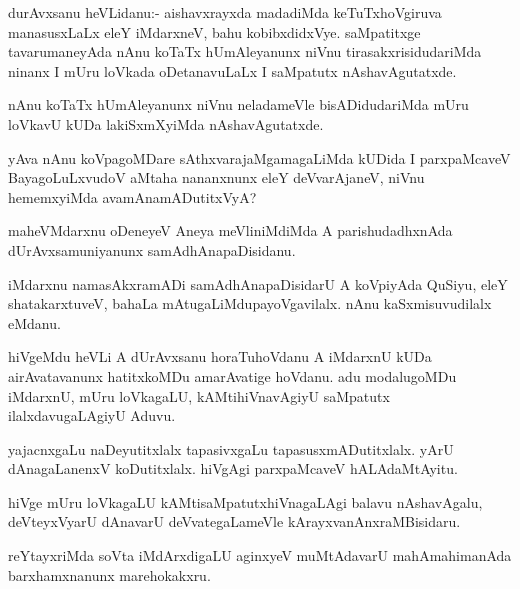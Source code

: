 \documentclass{article}
\begin{document}
\begin{mn}
durAvxsanu heVLidanu:- aishavxrayxda madadiMda keTuTxhoVgiruva
manasusxLaLx eleY iMdarxneV, bahu kobibxdidxVye. saMpatitxge
tavarumaneyAda nAnu koTaTx hUmAleyanunx niVnu tirasakxrisidudariMda
ninanx I mUru loVkada oDetanavuLaLx I saMpatutx nAshavAgutatxde.
\end{mn}

\begin{mn}
nAnu koTaTx hUmAleyanunx niVnu neladameVle bisADidudariMda mUru
loVkavU kUDa lakiSxmXyiMda nAshavAgutatxde.
\end{mn}

\begin{mn}
yAva nAnu koVpagoMDare sAthxvarajaMgamagaLiMda kUDida I parxpaMcaveV
BayagoLuLxvudoV aMtaha nananxnunx eleY deVvarAjaneV, niVnu hememxyiMda avamAnamADutitxVyA?
\end{mn}

\begin{mn}
maheVMdarxnu oDeneyeV Aneya meVliniMdiMda A parishudadhxnAda
dUrAvxsamuniyanunx samAdhAnapaDisidanu.
\end{mn}

\begin{mn}%
iMdarxnu namasAkxramADi samAdhAnapaDisidarU A koVpiyAda QuSiyu, eleY
shatakarxtuveV, bahaLa mAtugaLiMdupayoVgavilalx. nAnu kaSxmisuvudilalx eMdanu.
\end{mn}

\begin{mn}
hiVgeMdu heVLi A dUrAvxsanu horaTuhoVdanu A iMdarxnU kUDa
airAvatavanunx hatitxkoMDu amarAvatige hoVdanu. adu modalugoMDu
iMdarxnU, mUru loVkagaLU, kAMtihiVnavAgiyU saMpatutx ilalxdavugaLAgiyU Aduvu.
\end{mn}

\begin{mn}
yajacnxgaLu naDeyutitxlalx tapasivxgaLu tapasusxmADutitxlalx. yArU
dAnagaLanenxV koDutitxlalx. hiVgAgi parxpaMcaveV hALAdaMtAyitu.
\end{mn}

\begin{mn}
hiVge mUru loVkagaLU kAMtisaMpatutxhiVnagaLAgi balavu nAshavAgalu,
deVteyxVyarU dAnavarU deVvategaLameVle kArayxvanAnxraMBisidaru.
\end{mn}

\begin{mn}%
reYtayxriMda soVta iMdArxdigaLU aginxyeV muMtAdavarU mahAmahimanAda
barxhamxnanunx marehokakxru.
\end{mn}
\end{document}
